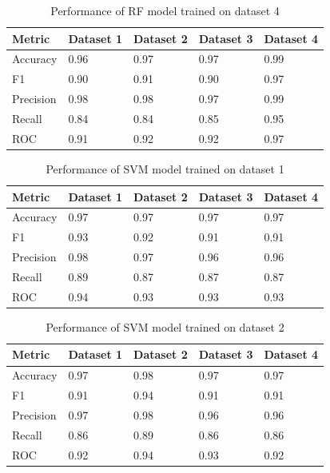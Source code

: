 \begin{table}[hbt]
\caption{Performance of RF model trained on dataset 4}\label{tab:performance_of_rf_model_trained_on_dataset_4}
\begin{tabular*}{\tblwidth}{@{}LLLLL@{}}
\toprule
    Metric & Dataset 1 & Dataset 2 & Dataset 3 & Dataset 4 \\
\midrule
    Accuracy & 0.96 & 0.97 & 0.97 & 0.99 \\
    F1 & 0.90 & 0.91 & 0.90 & 0.97 \\
    Precision & 0.98 & 0.98 & 0.97 & 0.99 \\
    Recall & 0.84 & 0.84 & 0.85 & 0.95 \\
    ROC & 0.91 & 0.92 & 0.92 & 0.97 \\
\bottomrule
\end{tabular*}
\end{table}

\begin{table}[hbt]
\caption{Performance of SVM model trained on dataset 1}\label{tab:performance_of_svm_model_trained_on_dataset_1}
\begin{tabular*}{\tblwidth}{@{}LLLLL@{}}
\toprule
    Metric & Dataset 1 & Dataset 2 & Dataset 3 & Dataset 4 \\
\midrule
    Accuracy & 0.97 & 0.97 & 0.97 & 0.97 \\
    F1 & 0.93 & 0.92 & 0.91 & 0.91 \\
    Precision & 0.98 & 0.97 & 0.96 & 0.96 \\
    Recall & 0.89 & 0.87 & 0.87 & 0.87 \\
    ROC & 0.94 & 0.93 & 0.93 & 0.93 \\
\bottomrule
\end{tabular*}
\end{table}

\begin{table}[hbt]
\caption{Performance of SVM model trained on dataset 2}\label{tab:performance_of_svm_model_trained_on_dataset_2}
\begin{tabular*}{\tblwidth}{@{}LLLLL@{}}
\toprule
    Metric & Dataset 1 & Dataset 2 & Dataset 3 & Dataset 4 \\
\midrule
    Accuracy & 0.97 & 0.98 & 0.97 & 0.97 \\
    F1 & 0.91 & 0.94 & 0.91 & 0.91 \\
    Precision & 0.97 & 0.98 & 0.96 & 0.96 \\
    Recall & 0.86 & 0.89 & 0.86 & 0.86 \\
    ROC & 0.92 & 0.94 & 0.93 & 0.92 \\
\bottomrule
\end{tabular*}
\end{table}

